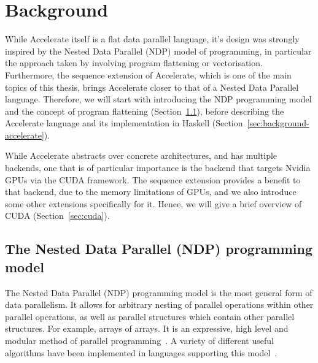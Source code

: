 \chapter{Background}
\label{chap:background}

While Accelerate itself is a flat data parallel language, it's design was strongly inspired by the Nested Data Parallel (NDP) model of programming, in particular the approach taken by \citet{Blelloch:compiling1988} involving program flattening or vectorisation. Furthermore, the sequence extension of Accelerate, which is one of the main topics of this thesis, brings Accelerate closer to that of a Nested Data Parallel language. Therefore, we will start with introducing the NDP programming model and the concept of program flattening (Section~\ref{sec:ndp}), before describing the Accelerate language and its implementation in Haskell (Section~\ref{sec:background-accelerate}).

While Accelerate abstracts over concrete architectures, and has multiple backends, one that is of particular importance is the backend that targets Nvidia GPUs via the CUDA framework. The sequence extension provides a benefit to that backend, due to the memory limitations of GPUs, and we also introduce some other extensions specifically for it. Hence, we will give a brief overview of CUDA (Section~\ref{sec:cuda}).



\section{The Nested Data Parallel (NDP) programming model}
\label{sec:ndp}

The Nested Data Parallel (NDP) programming model is the most general form of data parallelism. It allows for arbitrary nesting of parallel operations within other parallel operations, as well as parallel structures which contain other parallel structures. For example, arrays of arrays. It is an expressive, high level and modular method of parallel programming~\cite{Blelloch:1990vl}. A variety of different useful algorithms have been implemented in languages supporting this model~\cite{Blelloch:nbody94,Blelloch:delaunay96,Blelloch:connected94}.

